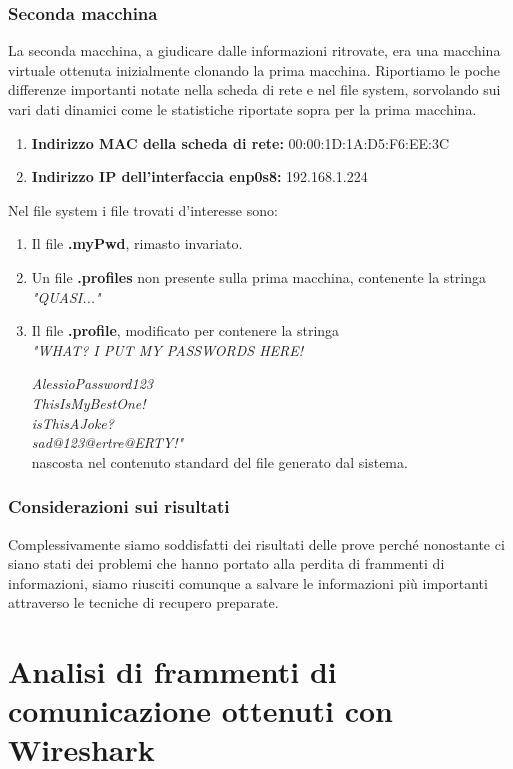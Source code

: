 \documentclass[a4paper]{report}
\begin{document}
\subsection{Seconda macchina}
La seconda macchina, a giudicare dalle informazioni ritrovate, era una macchina virtuale ottenuta inizialmente clonando la prima macchina. Riportiamo le poche differenze importanti notate nella scheda di rete e nel file system, sorvolando sui vari dati dinamici come le statistiche riportate sopra per la prima macchina.
\begin{enumerate}
	\item \textbf{Indirizzo MAC della scheda di rete:} 00:00:1D:1A:D5:F6:EE:3C
	\item \textbf{Indirizzo IP dell'interfaccia enp0s8:} 192.168.1.224
\end{enumerate}
Nel file system i file trovati d'interesse sono:
\begin{enumerate}
	\item Il file \textbf{.myPwd}, rimasto invariato.
	\item Un file \textbf{.profiles} non presente sulla prima macchina, contenente la stringa \textit{"QUASI..."}
	\item Il file \textbf{.profile}, modificato per contenere la stringa\\\textit{"WHAT? I PUT MY PASSWORDS HERE!}
	
	 \textit{AlessioPassword123}
	 \\\textit{ThisIsMyBestOne!}
	 \\\textit{isThisAJoke?}
	 \\\textit{sad@123@ertre@ERTY!"} \\nascosta nel contenuto standard del file generato dal sistema.
	 
\end{enumerate}

\subsection{Considerazioni sui risultati}
Complessivamente siamo soddisfatti dei risultati delle prove perché nonostante ci siano stati dei problemi che hanno portato alla perdita di frammenti di informazioni, siamo riusciti comunque a salvare le informazioni più importanti attraverso le tecniche di recupero preparate.

\chapter{Analisi di frammenti di comunicazione ottenuti con Wireshark}
\end{document}
